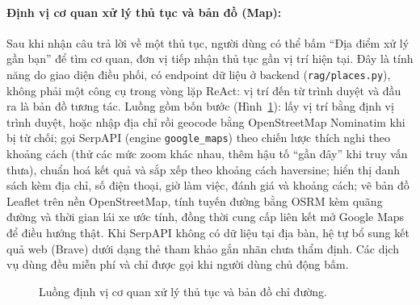 \documentclass[11pt]{article}
\begin{document}
\paragraph{Định vị cơ quan xử lý thủ tục và bản đồ (Map): }
Sau khi nhận câu trả lời về một thủ tục, người dùng có thể bấm ``Địa điểm xử lý gần bạn'' để
tìm cơ quan, đơn vị tiếp nhận thủ tục gần vị trí hiện tại. Đây là tính năng do giao diện điều
phối, có endpoint dữ liệu ở backend (\texttt{rag/places.py}), không phải một công cụ trong
vòng lặp ReAct: vị trí đến từ trình duyệt và đầu ra là bản đồ tương tác. Luồng gồm bốn bước
(Hình~\ref{fig:w4-map}): lấy vị trí bằng định vị trình duyệt, hoặc nhập địa chỉ rồi geocode
bằng OpenStreetMap Nominatim khi bị từ chối; gọi SerpAPI (engine \texttt{google\_maps}) theo
chiến lược thích nghi theo khoảng cách (thử các mức zoom khác nhau, thêm hậu tố ``gần đây'' khi
truy vấn thưa), chuẩn hoá kết quả và sắp xếp theo khoảng cách haversine; hiển thị danh sách kèm
địa chỉ, số điện thoại, giờ làm việc, đánh giá và khoảng cách; vẽ bản đồ Leaflet trên nền
OpenStreetMap, tính tuyến đường bằng OSRM kèm quãng đường và thời gian lái xe ước tính, đồng
thời cung cấp liên kết mở Google Maps để điều hướng thật. Khi SerpAPI không có dữ liệu tại địa
bàn, hệ tự bổ sung kết quả web (Brave) dưới dạng thẻ tham khảo gắn nhãn chưa thẩm định. Các
dịch vụ dùng đều miễn phí và chỉ được gọi khi người dùng chủ động bấm.

\begin{figure}[H]
\centering
{}
\caption{Luồng định vị cơ quan xử lý thủ tục và bản đồ chỉ đường.}
\label{fig:w4-map}
\end{figure}
\end{document}
